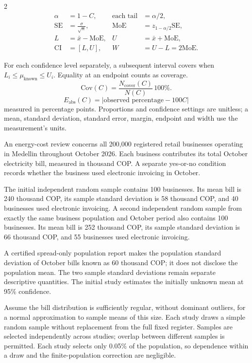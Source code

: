 \begin{multicols}{2}
\[
\begin{aligned}
\alpha&=1-C, &\text{each tail}&=\alpha/2,\\
\mathrm{SE}&=\frac{\sigma}{\sqrt n}, &\mathrm{MoE}&=z_{1-\alpha/2}\mathrm{SE},\\
L&=\bar x-\mathrm{MoE}, &U&=\bar x+\mathrm{MoE},\\
\mathrm{CI}&=[L,U], &W&=U-L=2\mathrm{MoE}.
\end{aligned}
\]

For each confidence level separately, a subsequent interval covers when
$L_i\leq\mu_{\mathrm{known}}\leq U_i$. Equality at an endpoint counts as coverage.
\[
\mathrm{Cov}(C)=\frac{N_{\mathrm{cover}}(C)}{N(C)}\,100\%.
\]
\[
E_{\mathrm{abs}}(C)=|\text{observed percentage}-100C|
\]
measured in percentage points.
Proportions and confidence settings are unitless; a mean, standard deviation, standard error, margin, endpoint and width use the measurement's units.

\endgroup

\columnbreak
\begingroup\small
{}


An energy-cost review concerns all 200,000 registered retail businesses operating in Medellin throughout October 2026. Each business contributes its total October electricity bill, measured in thousand COP. A separate yes-or-no condition records whether the business used electronic invoicing in October.

The initial independent random sample contains 100 businesses. Its mean bill is 240 thousand COP, its sample standard deviation is 58 thousand COP, and 40 businesses used electronic invoicing. A second independent random sample from exactly the same business population and October period also contains 100 businesses. Its mean bill is 252 thousand COP, its sample standard deviation is 66 thousand COP, and 55 businesses used electronic invoicing.

A certified spread-only population report makes the population standard deviation of October bills known as 60 thousand COP; it does not disclose the population mean. The two sample standard deviations remain separate descriptive quantities. The initial study estimates the initially unknown mean at 95\% confidence.

Assume the bill distribution is sufficiently regular, without dominant outliers, for a normal approximation to sample means of this size. Each study draws a simple random sample without replacement from the full fixed register. Samples are selected independently across studies; overlap between different samples is permitted. Each study selects only 0.05\% of the population, so dependence within a draw and the finite-population correction are negligible.


\end{multicols}
